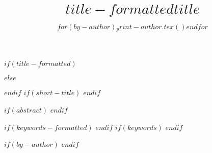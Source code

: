 
\author{$for(by-author)$$_print-author.tex()$$endfor$}

$if(title-formatted)$
\title{$title-formatted$}
$else$
\title{$title$}
$endif$
$if(short-title)$
$endif$

$if(abstract)$
$endif$

$if(keywords-formatted)$
$endif$
$if(keywords)$
$endif$


$if(by-author)$
$endif$